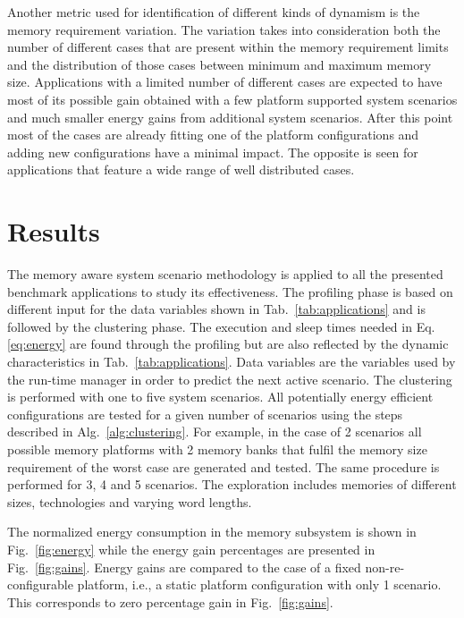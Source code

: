 \documentclass[a4paper,conference]{IEEEtran}
\begin{document}
Another metric used for identification of different kinds of dynamism is the memory requirement variation. The variation takes into consideration both the number of different cases that are present within the memory requirement limits and the distribution of those cases between minimum and maximum memory size. Applications with a limited number of different cases are expected to have most of its possible gain obtained with a few platform supported system scenarios and much smaller energy gains from additional system scenarios. After this point most of the cases are already fitting one of the platform configurations and adding new configurations have a minimal impact. The opposite is seen for applications that feature a wide range of well distributed cases.

\section{Results}
\label{sec:results}

The memory aware system scenario methodology is applied to all the presented benchmark applications to study its effectiveness. The profiling phase is based on different input for the data variables shown in Tab.~\ref{tab:applications} and is followed by the clustering phase. The execution and sleep times needed in Eq.\ref{eq:energy} are found through the profiling but are also reflected by the dynamic characteristics in Tab.~\ref{tab:applications}. Data variables are the variables used by the run-time manager in order to predict the next active scenario. The clustering is performed with one to five system scenarios. All potentially energy efficient configurations are tested for a given number of scenarios using the steps described in Alg.~\ref{alg:clustering}. For example, in the case of 2 scenarios all possible memory platforms with 2 memory banks that fulfil the memory size requirement of the worst case are generated and tested. The same procedure is performed for 3, 4 and 5 scenarios. The exploration includes memories of different sizes, technologies and varying word lengths. 

The normalized energy consumption in the memory subsystem is shown in Fig.~\ref{fig:energy} while the energy gain percentages are presented in Fig.~\ref{fig:gains}. 
Energy gains are compared to the case of a fixed non-re-configurable platform, i.e., a static platform configuration with only 1 scenario. This corresponds to zero percentage gain in Fig.~\ref{fig:gains}. 

\end{document}

